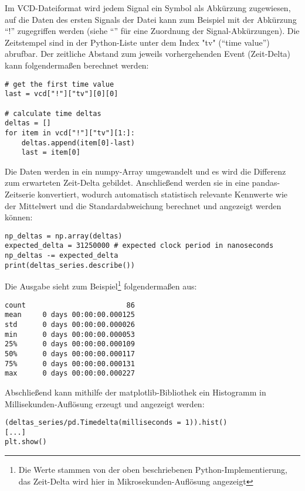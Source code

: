 Im VCD-Dateiformat wird jedem Signal ein Symbol als Abkürzung zugewiesen, auf die Daten des ersten Signals der Datei kann zum Beispiel mit der Abkürzung ``!'' zugegriffen werden (siehe ``'' für eine Zuordnung der Signal-Abkürzungen).
Die Zeitstempel sind in der Python-Liste unter dem Index "tv" (``time value'') abrufbar. 
Der zeitliche Abstand zum jeweils vorhergehenden Event (Zeit-Delta) kann folgendermaßen berechnet werden:
 
\begin{verbatim}
# get the first time value
last = vcd["!"]["tv"][0][0]

# calculate time deltas
deltas = []
for item in vcd["!"]["tv"][1:]: 
    deltas.append(item[0]-last)
    last = item[0]
\end{verbatim}

Die Daten werden in ein numpy-Array umgewandelt und es wird die Differenz zum erwarteten Zeit-Delta gebildet. 
Anschließend werden sie in eine pandas-Zeitserie konvertiert, wodurch automatisch statistisch relevante Kennwerte wie der Mittelwert und die Standardabweichung berechnet und angezeigt werden können:
 
\begin{verbatim}
np_deltas = np.array(deltas)
expected_delta = 31250000 # expected clock period in nanoseconds
np_deltas -= expected_delta
print(deltas_series.describe())
\end{verbatim}

Die Ausgabe sieht zum Beispiel\footnote{Die Werte stammen von der oben beschriebenen Python-Implementierung, das Zeit-Delta wird hier in Mikrosekunden-Auflösung angezeigt} folgendermaßen aus:

\begin{verbatim}
count                        86
mean     0 days 00:00:00.000125
std      0 days 00:00:00.000026
min      0 days 00:00:00.000053
25%      0 days 00:00:00.000109
50%      0 days 00:00:00.000117
75%      0 days 00:00:00.000131
max      0 days 00:00:00.000227

\end{verbatim}

Abschließend kann mithilfe der matplotlib-Bibliothek ein Histogramm in Millisekunden-Auflösung erzeugt und angezeigt werden:

\begin{verbatim}
(deltas_series/pd.Timedelta(milliseconds = 1)).hist()
[...]
plt.show()
\end{verbatim}

